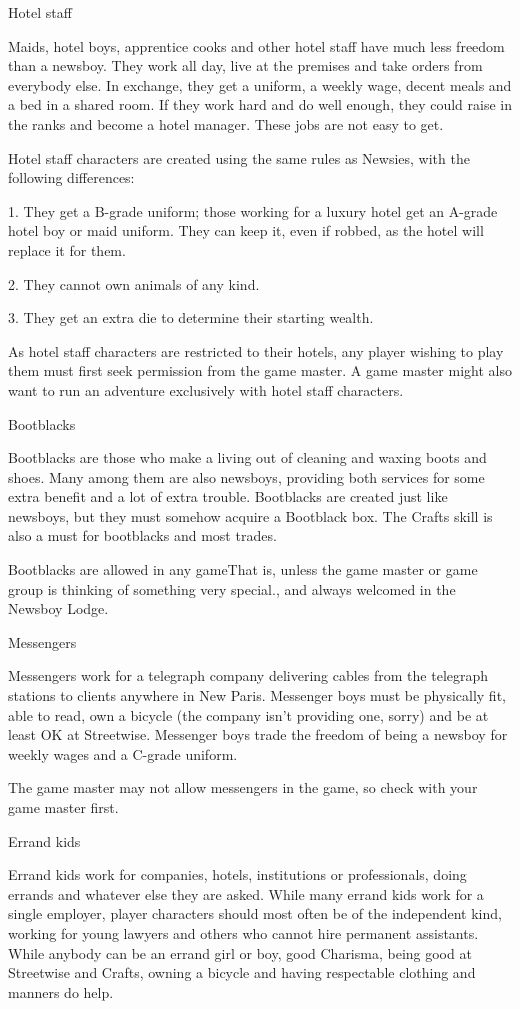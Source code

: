 Hotel staff

Maids, hotel boys, apprentice cooks and other hotel staff have much less freedom than a newsboy. They work all day, live at the premises and take orders from everybody else. In exchange, they get a uniform, a weekly wage, decent meals and a bed in a shared room. If they work hard and do well enough, they could raise in the ranks and become a hotel manager. These jobs are not easy to get.

Hotel staff characters are created using the same rules as Newsies, with the following differences:

1. They get a B-grade uniform; those working for a luxury hotel get an A-grade hotel boy or maid uniform. They can keep it, even if robbed, as the hotel will replace it for them.

2. They cannot own animals of any kind.

3. They get an extra die to determine their starting wealth.

As hotel staff characters are restricted to their hotels, any player wishing to play them must first seek permission from the game master. A game master might also want to run an adventure exclusively with hotel staff characters.

Bootblacks

Bootblacks are those who make a living out of cleaning and waxing boots and shoes. Many among them are also newsboys, providing both services for some extra benefit and a lot of extra trouble. Bootblacks are created just like newsboys, but they must somehow acquire a Bootblack box. The Crafts skill is also a must for bootblacks and most trades.

Bootblacks are allowed in any gameThat is, unless the game master or game group is thinking of something very special., and always welcomed in the Newsboy Lodge.

Messengers

Messengers work for a telegraph company delivering cables from the telegraph stations to clients anywhere in New Paris. Messenger boys must be physically fit, able to read, own a bicycle (the company isn't providing one, sorry) and be at least OK at Streetwise. Messenger boys trade the freedom of being a newsboy for weekly wages and a C-grade uniform.

The game master may not allow messengers in the game, so check with your game master first.

Errand kids

Errand kids work for companies, hotels, institutions or professionals, doing errands and whatever else they are asked. While many errand kids work for a single employer, player characters should most often be of the independent kind, working for young lawyers and others who cannot hire permanent assistants. While anybody can be an errand girl or boy, good Charisma, being good at Streetwise and Crafts, owning a bicycle and having respectable clothing and manners do help.

